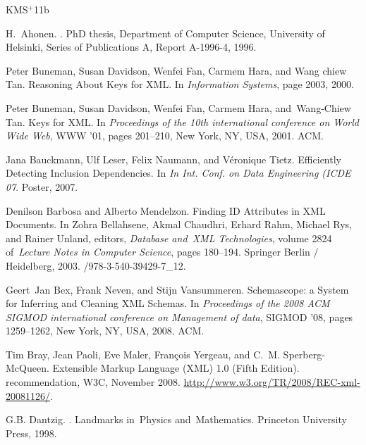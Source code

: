 \newcommand{\etalchar}[1]{$^{#1}$}
\begin{thebibliography}{KMS{\etalchar{+}}11b}

H.~Ahonen.
.
\newblock PhD thesis, Department of Computer Science, University of Helsinki, Series of Publications A, Report A-1996-4, 1996.

\bibitem[BDF{\etalchar{+}}00]{fajt-12}
Peter Buneman, Susan Davidson, Wenfei Fan, Carmem Hara, and Wang chiew Tan.
\newblock Reasoning About Keys for XML.
\newblock In {\em Information Systems}, page 2003, 2000.

\bibitem[BDF{\etalchar{+}}01]{keX}
Peter Buneman, Susan Davidson, Wenfei Fan, Carmem Hara, and~Wang-Chiew Tan.
\newblock Keys for XML.
\newblock In {\em Proceedings of the 10th international conference on World Wide Web}, WWW '01, pages 201--210, New York, NY, USA, 2001. ACM.

Jana Bauckmann, Ulf Leser, Felix Naumann, and Véronique Tietz.
\newblock Efficiently Detecting Inclusion Dependencies.
\newblock In {\em In Int. Conf. on Data Engineering (ICDE 07}. Poster, 2007.

Denilson Barbosa and Alberto Mendelzon.
\newblock Finding ID Attributes in XML Documents.
\newblock In Zohra Bellahsene, Akmal Chaudhri, Erhard Rahm, Michael Rys, and Rainer Unland, editors, {\em Database and~XML Technologies}, volume 2824 of~{\em Lecture Notes in Computer Science}, pages 180--194. Springer Berlin / Heidelberg, 2003.
/978-3-540-39429-7\_12.

Geert~Jan Bex, Frank Neven, and Stijn Vansummeren.
\newblock Schemascope: a System for Inferring and Cleaning XML Schemas.
\newblock In {\em Proceedings of the 2008 ACM SIGMOD international conference on Management of data}, SIGMOD '08, pages 1259--1262, New York, NY, USA, 2008. ACM.

\bibitem[BPM{\etalchar{+}}08]{Bray:08:EML}
Tim Bray, Jean Paoli, Eve Maler, Fran\c{c}ois Yergeau, and C.~M. Sperberg-McQueen.
\newblock Extensible Markup Language ({XML}) 1.0 (Fifth Edition).
 recommendation, W3C, November 2008.
\newblock \url{http://www.w3.org/TR/2008/REC-xml-20081126/}.

G.B. Dantzig.
.
\newblock Landmarks in~Physics and~Mathematics. Princeton University Press, 1998.


\end{thebibliography}
